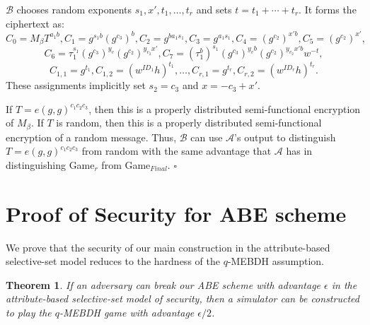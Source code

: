 \documentclass[a4paper, 11pt]{article}
\newtheorem{theorem}{Theorem}
\newenvironment{proof}{\par\noindent{\bf Proof.}}{$\square$\par\bigskip}
\newtheorem{theorem}{Theorem}[section]
\theoremstyle{definition}
\begin{document}
\begin{proof}
$\mathcal{B}$ chooses random exponents $s_1, x', t_1, \ldots, t_r$ and sets $t = t_1+ \cdots + t_r$. It forms the ciphertext as:
\[C_0 = M_{\beta} T^{a_1 b}, C_1 = g^{s_1 b}(g^{c_3})^b, C_2 = g^{b a_1 s_1}, C_3 = g^{a_1 s_1}, C_4 = (g^{c_2})^{x'b}, C_5 = (g^{c_2})^{x'},\]
\[C_6 = \tau_1^{s_1}(g^{c_3})^{y_v}(g^{c_2})^{y_{v_2}x'}, C_7 = (\tau_1^b)^{s_1}(g^{c_3})^{y_v b}(g^{c_2})^{y_{v_2}x' b} w^{-t},\]
\[C_{1,1} = g^{t_1}, C_{1,2} = (w^{ID_1}h)^{t_1}, \ldots, C_{r,1} = g^{t_r}, C_{r,2} = (w^{ID_r}h)^{t_r}.\]
These assignments implicitly set $s_2 = c_3$ and $x = -c_3+x'$.

If $T = e(g,g)^{c_1c_2c_3}$, then this is a properly distributed semi-functional encryption of $M_\beta$. If $T$ is random, then this is a properly distributed semi-functional encryption of a random message. Thus, $\mathcal{B}$ can use $\mathcal{A}$'s output to distinguish $T = e(g,g)^{c_1 c_2 c_3}$ from random with the same advantage that $\mathcal{A}$ has in distinguishing Game$_r$ from Game$_{Final}$.
\end{proof}

\section{Proof of Security for ABE scheme}
\label{sec:ABE-proof}

We prove that the security of our main construction
in the
attribute-based selective-set model reduces to
the hardness of the $q$-MEBDH assumption.



\begin{theorem} If an adversary can break our ABE scheme with advantage $\epsilon$ in the
attribute-based selective-set model of security, then a simulator can be
constructed to play the $q$-MEBDH game with
advantage $\epsilon/2$.\end{theorem}
\end{document}
